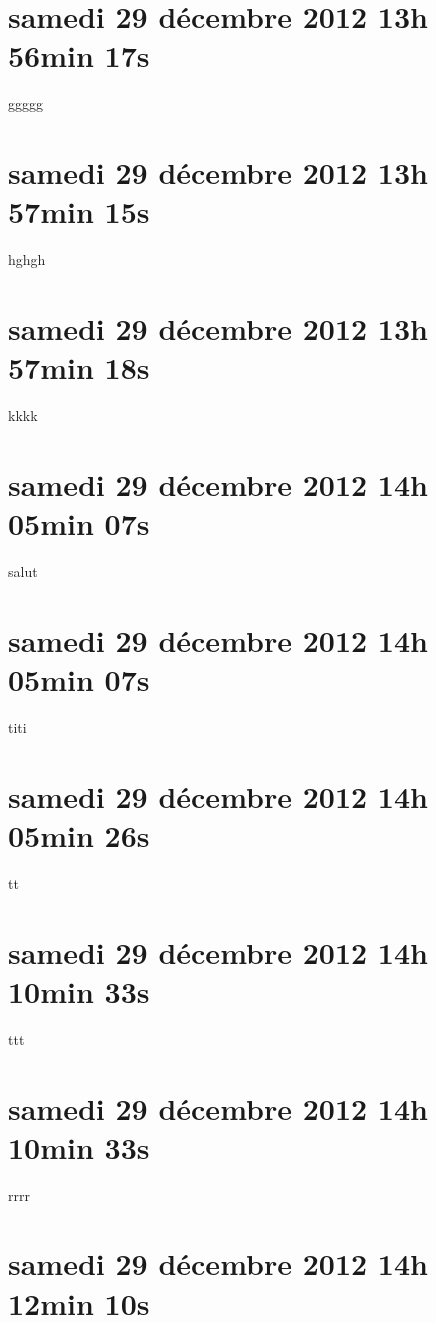 
\section{samedi 29 décembre 2012 13h 56min 17s}

ggggg

\section{samedi 29 décembre 2012 13h 57min 15s}

hghgh

\section{samedi 29 décembre 2012 13h 57min 18s}

kkkk

\section{samedi 29 décembre 2012 14h 05min 07s}

salut

\section{samedi 29 décembre 2012 14h 05min 07s}

titi

\section{samedi 29 décembre 2012 14h 05min 26s}

tt

\section{samedi 29 décembre 2012 14h 10min 33s}

ttt

\section{samedi 29 décembre 2012 14h 10min 33s}

rrrr

\section{samedi 29 décembre 2012 14h 12min 10s}

